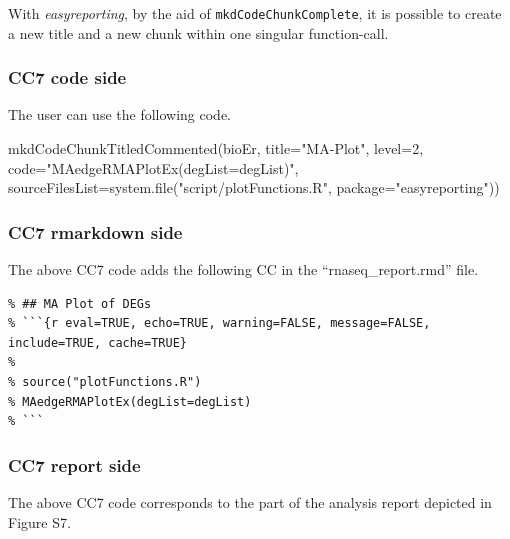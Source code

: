 \documentclass[
]{article}
\newenvironment{Shaded}{\begin{snugshade}}{\end{snugshade}}
\newcommand{\AttributeTok}[1]{\textcolor[rgb]{0.77,0.63,0.00}{#1}}
\newcommand{\DecValTok}[1]{\textcolor[rgb]{0.00,0.00,0.81}{#1}}
\newcommand{\FunctionTok}[1]{\textcolor[rgb]{0.00,0.00,0.00}{#1}}
\newcommand{\NormalTok}[1]{#1}
\newcommand{\StringTok}[1]{\textcolor[rgb]{0.31,0.60,0.02}{#1}}
\begin{document}
With \emph{easyreporting}, by the aid of \texttt{mkdCodeChunkComplete},
it is possible to create a new title and a new chunk within one singular
function-call.

\hypertarget{cc7-code-side}{%
\subsubsection{CC7 code side}\label{cc7-code-side}}

The user can use the following code.

\begin{Shaded}
\begin{Highlighting}[]
\FunctionTok{mkdCodeChunkTitledCommented}\NormalTok{(bioEr, }\AttributeTok{title=}\StringTok{"MA{-}Plot"}\NormalTok{, }\AttributeTok{level=}\DecValTok{2}\NormalTok{,}
                            \AttributeTok{code=}\StringTok{"MAedgeRMAPlotEx(degList=degList)"}\NormalTok{,}
                            \AttributeTok{sourceFilesList=}\FunctionTok{system.file}\NormalTok{(}\StringTok{"script/plotFunctions.R"}\NormalTok{, }
                                                        \AttributeTok{package=}\StringTok{"easyreporting"}\NormalTok{))}
\end{Highlighting}
\end{Shaded}

\hypertarget{cc7-rmarkdown-side}{%
\subsubsection{CC7 rmarkdown side}\label{cc7-rmarkdown-side}}

The above CC7 code adds the following CC in the ``rnaseq\_report.rmd''
file.

\begin{verbatim}
% ## MA Plot of DEGs
% ```{r eval=TRUE, echo=TRUE, warning=FALSE, message=FALSE, include=TRUE, cache=TRUE}
% 
% source("plotFunctions.R")
% MAedgeRMAPlotEx(degList=degList)
% ```
\end{verbatim}

\newpage

\hypertarget{cc7-report-side}{%
\subsubsection{CC7 report side}\label{cc7-report-side}}

The above CC7 code corresponds to the part of the analysis report
depicted in Figure S7.
\end{document}
